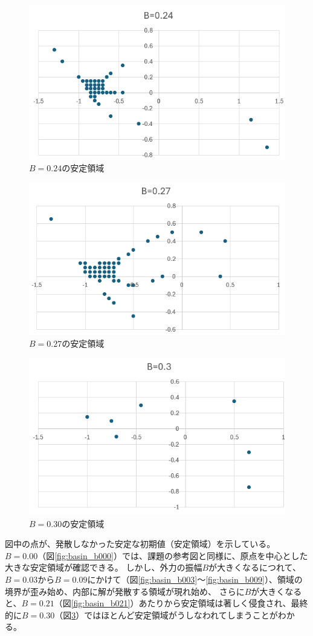 \documentclass[dvipdfmx,a4paper]{jsarticle}
\begin{document}
\begin{figure}[H]
    \centering
    \includegraphics[width=0.45\linewidth]{summer/software-engineering/images/b0.24.png}
    \caption{$B=0.24$の安定領域}
    \label{fig:basin_b024}
\end{figure}
\begin{figure}[H]
    \centering
    \includegraphics[width=0.45\linewidth]{summer/software-engineering/images/b0.27.png}
    \caption{$B=0.27$の安定領域}
    \label{fig:basin_b027}
\end{figure}
\begin{figure}[H]
    \centering
    \includegraphics[width=0.45\linewidth]{summer/software-engineering/images/b0.3.png}
    \caption{$B=0.30$の安定領域}
    \label{fig:basin_b030}
\end{figure}

図中の点が、発散しなかった安定な初期値（安定領域）を示している。
$B=0.00$（図\ref{fig:basin_b000}）では、課題の参考図と同様に、原点を中心とした大きな安定領域が確認できる。
しかし、外力の振幅$B$が大きくなるにつれて、$B=0.03$から$B=0.09$にかけて（図\ref{fig:basin_b003}〜\ref{fig:basin_b009}）、領域の境界が歪み始め、内部に解が発散する領域が現れ始め、
さらに$B$が大きくなると、$B=0.21$（図\ref{fig:basin_b021}）あたりから安定領域は著しく侵食され、最終的に$B=0.30$（図\ref{fig:basin_b030}）ではほとんど安定領域がうしなわれてしまうことがわかる。
\end{document}

